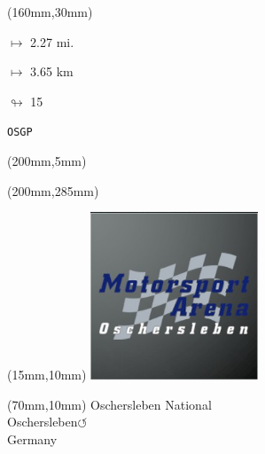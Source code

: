 \begin{textblock*}{40mm}(160mm,30mm)%
\Large
\par$\mapsto$ 2.27 mi.
\par$\mapsto$ 3.65 km
\par$\looparrowright$ 15
\par\hfill\tiny\tt OSGP\\
\end{textblock*}
\begin{textblock*}{20mm}(200mm,5mm)%
\fbox{\thepage}
\label{OSGP}
\end{textblock*}
\begin{textblock*}{20mm}(200mm,285mm)%
\fbox{\thepage}
\end{textblock*}

\null\newpage
\begin{textblock*}{50mm}(15mm,10mm)%
\includegraphics[width=50mm]{LG/2015-05-20_00090.png}
\end{textblock*}
\begin{textblock*}{130mm}(70mm,10mm)%
{\fontsize{20}{20}\selectfont Oschersleben National\\}
{\fontsize{16}{16}\selectfont Oschersleben\hfill \huge$\circlearrowleft$\\}
{\fontsize{12}{12}\selectfont Germany\\}
\end{textblock*}
